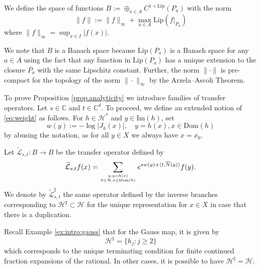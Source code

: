 \documentclass[12pt,a4paper,reqno]{amsart}
\newcommand{\tcb}{\textcolor{blue}}
\begin{document}
\begin{definition} \label{def:lip}
We define  the space of functions 
$B :=\oplus_{a \in A} C^{1+\mathrm{Lip}}(P_a)$
with the norm 
\[ \|f\| := \| f \|_\infty + \max_{a \in A} \mathrm{Lip}(f|_{P_a})  \]
where $ \| f \|_\infty=\sup_{x\in I} |f(x)|$.
\end{definition}

We note that $B$  is a Banach space because $\mathrm{Lip}( P_a)$ is a Banach space for any $a \in A$ using the fact that any function in $\mathrm{Lip}(P_a)$ has a unique extension to the closure $\overline{P_a}$ with the same Lipschitz constant. Further, the norm $\| \cdot \|$ is pre-compact for the topology of the norm $\| \cdot \|_\infty$ by the Arzela--Ascoli Theorem. 




To prove Proposition \ref{prop.analyticity} we introduce families of transfer operators. Let $s \in \mathbb{C}$ and $t \in \mathbb{C}^d$. To proceed, we define an extended notion of \eqref{eq:weight} as follows. For $h \in \mathcal{H}^\ast$ and $y \in \mathrm{Im}(h)$, set
\[ w(y):=-\log|J_h(x)| , \quad y=h(x), x \in \mathrm{Dom}(h)  \]
by abusing the notation, as for all $y \in X$ we always have $x=x_0$.

\begin{definition}
Let $\widetilde{\mathcal{L}}_{s,t} : B \to B$ be the transfer  operator defined by
\[
\widetilde{\mathcal{L}}_{s,t}f(x) = \sum_{y : y = h(x) \atop h \in \mathcal{H}, x \in \mathrm{Dom}(h)} e^{s w(y)+ \langle t, \overline N(y) \rangle} f(y).
\]
We denote by $\widetilde{\mathcal{L}}_{s,t}^\sharp$ the same operator defined by the inverse branches corresponding to $\mathcal{H}^\sharp \subset \mathcal{H}$ for the unique representation for $x \in X$ in case that there is a duplication. 
\end{definition}

\begin{remark}
Recall Example \ref{ex:intro:gauss} that for the Gauss map, it is given by 
\[ \mathcal{H}^\sharp = \{ h_j : j \geq 2 \} \]
which corresponds to the unique terminating condition for finite continued fraction expansions of the rational. In other cases, it is possible to have $\mathcal{H}^\sharp=\mathcal{H}$.
\end{remark}
\end{document}
